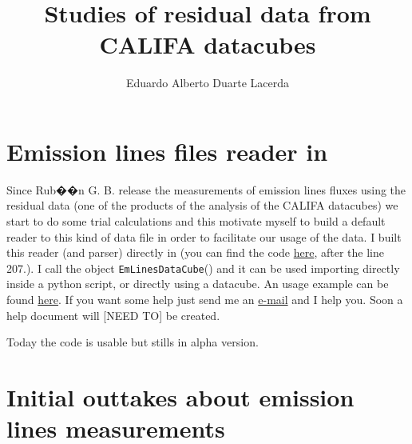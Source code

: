 \documentclass[a4paper,11pt]{article}
\begin{document}
\title{Studies of residual data from CALIFA datacubes}
\author{Eduardo Alberto Duarte Lacerda}

\section{Emission lines files reader in \pycasso}

Since Rub��n G. B. release the measurements of emission lines fluxes using the residual data (one of the products of the \starlight analysis of the CALIFA datacubes) we start to do some trial calculations and this motivate myself to build a default reader to this kind of data file in order to facilitate our usage of the data. I built this reader (and parser) directly in \pycasso (you can find the code \href{https://bitbucket.org/astro_ufsc/pycasso/src/38741376583e216a040b266958e673d2b4b628d5/src/pycasso/fitsdatacube.py?at=default}{here},  after the line 207.). I call the object \texttt{EmLinesDataCube}() and it can be used importing directly inside a python script, or directly using a \pycasso datacube. An usage example can be found \href{https://bitbucket.org/astro_ufsc/pycasso/src/38741376583e216a040b266958e673d2b4b628d5/contrib/emLinesExample.py?at=default}{here}. If you want some help just send me an \href{mailto:lacerda@iaa.es}{e-mail} and I help you. Soon a help document will [NEED TO] be created.

Today the code is usable but stills in alpha version.

\section{Initial outtakes about emission lines measurements}

\end{document}
